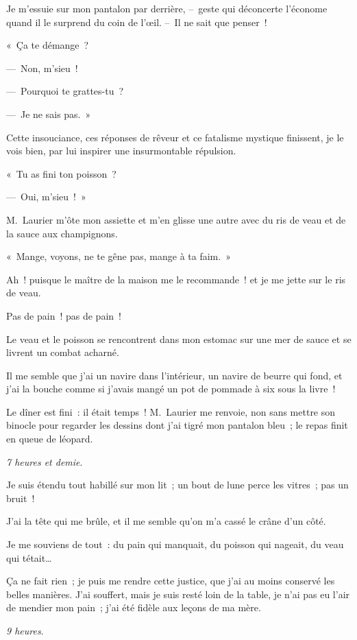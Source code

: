 \documentclass[french,twoside]{book} %
\begin{document}
Je m’essuie sur mon pantalon par derrière, – geste qui déconcerte l’économe quand il le surprend du coin de l’œil. – Il ne sait que penser !\par
« Ça te démange ?\par
— Non, m’sieu !\par
— Pourquoi te grattes-tu ?\par
— Je ne sais pas. »\par
Cette insouciance, ces réponses de rêveur et ce fatalisme mystique finissent, je le vois bien, par lui inspirer une insurmontable répulsion.\par
« Tu as fini ton poisson ?\par
— Oui, m’sieu ! »\par
M. Laurier m’ôte mon assiette et m’en glisse une autre avec du ris de veau et de la sauce aux champignons.\par
« Mange, voyons, ne te gêne pas, mange à ta faim. »\par
Ah ! puisque le maître de la maison me le recommande ! et je me jette sur le ris de veau.\par
Pas de pain ! pas de pain !\par
Le veau et le poisson se rencontrent dans mon estomac sur une mer de sauce et se livrent un combat acharné.\par
Il me semble que j’ai un navire dans l’intérieur, un navire de beurre qui fond, et j’ai la bouche comme si j’avais mangé un pot de pommade à six sous la livre !\par
Le dîner est fini : il était temps ! M. Laurier me renvoie, non sans mettre son binocle pour regarder les dessins dont j’ai tigré mon pantalon bleu ; le repas finit en queue de léopard.\par
\emph{7 heures et demie}.\par
Je suis étendu tout habillé sur mon lit ; un bout de lune perce les vitres ; pas un bruit !\par
J’ai la tête qui me brûle, et il me semble qu’on m’a cassé le crâne d’un côté.\par
Je me souviens de tout : du pain qui manquait, du poisson qui nageait, du veau qui tétait…\par
Ça ne fait rien ; je puis me rendre cette justice, que j’ai au moins conservé les belles manières. J’ai souffert, mais je suis resté loin de la table, je n’ai pas eu l’air de mendier mon pain ; j’ai été fidèle aux leçons de ma mère.\par
\bigbreak
\noindent \emph{9 heures}.\par
\end{document}

